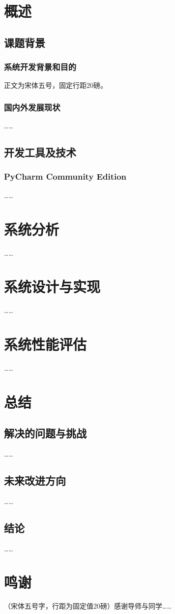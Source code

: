 \documentclass{gdou-ugthesis}
\begin{document}
\makethesistitlepage

\tableofcontents


\chapter{概述}
\section{课题背景}
\subsection{系统开发背景和目的}
正文为宋体五号，固定行距20磅。

\subsection{国内外发展现状}
……

\section{开发工具及技术}
\subsection{PyCharm Community Edition}
……

\chapter{系统分析}
……

\chapter{系统设计与实现}
……

\chapter{系统性能评估}
……

\chapter{总结}
\section{解决的问题与挑战}
……
\section{未来改进方向}
……
\section{结论}
……

\chapter*{鸣谢}
（宋体五号字，行距为固定值20磅）感谢导师与同学……

\printbibliography[heading=bibintoc,title=参考文献]
\end{document}
